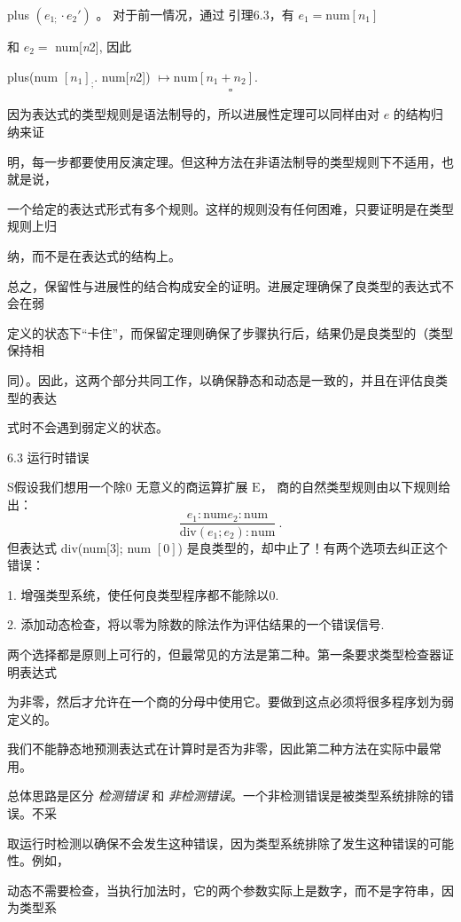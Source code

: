 plus $(e_{1;}\cdot e_{2}')$ 。 对于前一情况，通过
引理6.3，有 $e_{1}=\mathrm{n}\mathrm{u}\mathrm{m}[n_{1}]$

和 $e_{2}=$ num[{\it n}2], 因此

plus(num $[n_{1}]_{;}$. num[{\it n}2]) $\mapsto \mathrm{n}\mathrm{u}\mathrm{m}[n_{1}+n_{2}].$
$$
\square 
$$

因为表达式的类型规则是语法制导的，所以进展性定理可以同样由对 $e$ 的结构归纳来证

明，每一步都要使用反演定理。但这种方法在非语法制导的类型规则下不适用，也就是说，

一个给定的表达式形式有多个规则。这样的规则没有任何困难，只要证明是在类型规则上归

纳，而不是在表达式的结构上。

总之，保留性与进展性的结合构成安全的证明。进展定理确保了良类型的表达式不会在弱

定义的状态下“卡住”，而保留定理则确保了步骤执行后，结果仍是良类型的（类型保持相

同）。因此，这两个部分共同工作，以确保静态和动态是一致的，并且在评估良类型的表达

式时不会遇到弱定义的状态。

6.3 运行时错误

S假设我们想用一个除0 无意义的商运算扩展 $\mathrm{E}$， 商的自然类型规则由以下规则给出：
$$
\frac{e_{1}:\mathrm{n}\mathrm{u}\mathrm{m}e_{2}:\mathrm{n}\mathrm{u}\mathrm{m}}{\mathrm{d}\mathrm{i}\mathrm{v}(e_{1};e_{2}):\mathrm{n}\mathrm{u}\mathrm{m}}\ .
$$
但表达式 $\mathrm{d}\mathrm{i}\mathrm{v}$(num[3]; num $[0]$) 是良类型的，却中止了！有两个选项去纠正这个错误：

1. 增强类型系统，使任何良类型程序都不能除以0.

2. 添加动态检查，将以零为除数的除法作为评估结果的一个错误信号.

两个选择都是原则上可行的，但最常见的方法是第二种。第一条要求类型检查器证明表达式

为非零，然后才允许在一个商的分母中使用它。要做到这点必须将很多程序划为弱定义的。

我们不能静态地预测表达式在计算时是否为非零，因此第二种方法在实际中最常用。

总体思路是区分 {\it 检测错误} 和 {\it 非检测错误}。一个非检测错误是被类型系统排除的错误。不采

取运行时检测以确保不会发生这种错误，因为类型系统排除了发生这种错误的可能性。例如，

动态不需要检查，当执行加法时，它的两个参数实际上是数字，而不是字符串，因为类型系

